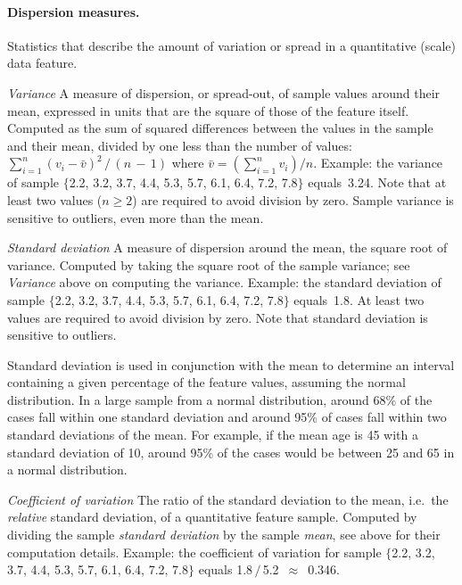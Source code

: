 \paragraph{Dispersion measures.}
Statistics that describe the amount of variation or spread in a quantitative
(scale) data feature.
\begin{Description}
\item[\it Variance]
\OutputRowText{\OutputRowIDVariance}
A measure of dispersion, or spread-out, of sample values around their mean,
expressed in units that are the square of those of the feature itself.
Computed as the sum of squared differences between the values
in the sample and their mean, divided by one less than the number of
values: $\sum_{i=1}^n (v_i - \bar{v})^2\,/\,(n\,{-}\,1)$ where 
$\bar{v}=\left(\sum_{i=1}^n v_i\right)\!/n$.
Example: the variance of sample
$\{$2.2, 3.2, 3.7, 4.4, 5.3, 5.7, 6.1, 6.4, 7.2, 7.8$\}$ equals~3.24.
Note that at least two values ($n\geq 2$) are required to avoid division
by zero.  Sample variance is sensitive to outliers, even more than the mean.
\item[\it Standard deviation]
\OutputRowText{\OutputRowIDStDeviation}
A measure of dispersion around the mean, the square root of variance.
Computed by taking the square root of the sample variance;
see \emph{Variance} above on computing the variance.
Example: the standard deviation of sample
$\{$2.2, 3.2, 3.7, 4.4, 5.3, 5.7, 6.1, 6.4, 7.2, 7.8$\}$ equals~1.8.
At least two values are required to avoid division by zero.
Note that standard deviation is sensitive to outliers.  

Standard deviation is used in conjunction with the mean to determine
an interval containing a given percentage of the feature values,
assuming the normal distribution.  In a large sample from a normal
distribution, around 68\% of the cases fall within one standard
deviation and around 95\% of cases fall within two standard deviations
of the mean.  For example, if the mean age is 45 with a standard deviation
of 10, around 95\% of the cases would be between 25 and 65 in a normal
distribution.
\item[\it Coefficient of variation]
\OutputRowText{\OutputRowIDCoeffVar}
The ratio of the standard deviation to the mean, i.e.\ the
\emph{relative} standard deviation, of a quantitative feature sample.
Computed by dividing the sample \emph{standard deviation} by the
sample \emph{mean}, see above for their computation details.
Example: the coefficient of variation for sample
$\{$2.2, 3.2, 3.7, 4.4, 5.3, 5.7, 6.1, 6.4, 7.2, 7.8$\}$
equals 1.8$\,{/}\,$5.2~${\approx}$~0.346.


\end{Description}
